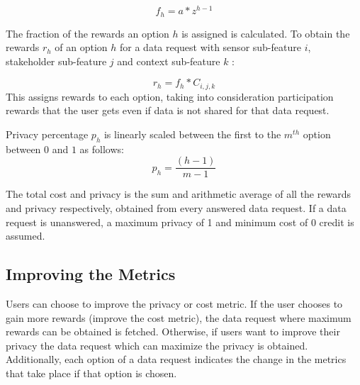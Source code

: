 \begin{equation}
f_{h} = a * z^{h-1}
\end{equation}

The fraction of the rewards an option $h$ is assigned is calculated. To obtain the rewards $r_{h}$ of an option $h$ for a data request with sensor sub-feature $i$, stakeholder sub-feature $j$ and
context sub-feature $k$ :

\begin{equation}
r_{h} = f_{h} * C_{i,j,k}
\end{equation}
This assigns rewards to each option, taking into consideration participation rewards that the user gets even if data is not shared for that data request.

Privacy percentage $p_{h}$ is linearly scaled between the first to the $m^{th}$ option between $0$ and $1$ as follows:
\begin{equation}
p_{h} = \frac{(h-1)}{m-1}
\end{equation}

The total cost and privacy is the sum and arithmetic average of all the rewards and privacy respectively, obtained from every answered data request. If a data request is unanswered, a maximum privacy of 1 and minimum cost of 0 credit is assumed.


\subsection{Improving the Metrics}
Users can choose to improve the privacy or cost metric. If the user chooses to gain more rewards (improve the cost metric), the data request where maximum rewards can be obtained is fetched. Otherwise, if users want to improve their privacy the data request which can maximize the privacy is obtained. Additionally, each option of a data request indicates the change in the metrics that take place if that option is chosen.

